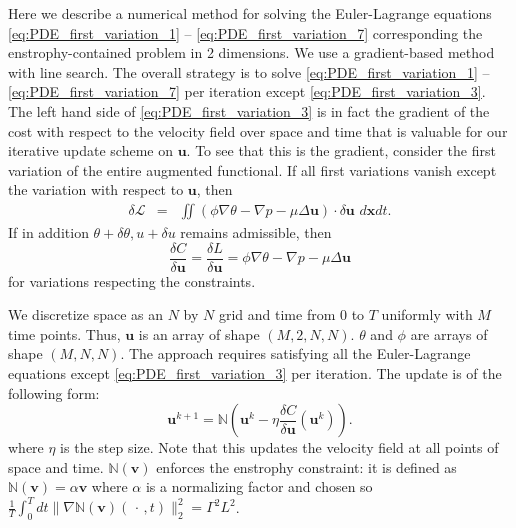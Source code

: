 Here we describe a numerical method for solving the Euler-Lagrange equations \eqref{eq:PDE_first_variation_1} -- \eqref{eq:PDE_first_variation_7} corresponding the enstrophy-contained problem in 2 dimensions. We use a gradient-based method with line search. The overall strategy is to solve \eqref{eq:PDE_first_variation_1} -- \eqref{eq:PDE_first_variation_7} per iteration except \eqref{eq:PDE_first_variation_3}. The left hand side of \eqref{eq:PDE_first_variation_3} is in fact the gradient of the cost with respect to the velocity field over space and time that is valuable for our iterative update scheme on $\mathbf{u}$. To see that this is the gradient, consider the first variation of the entire augmented functional. If all first variations vanish except the variation with respect to $\mathbf{u}$, then
%
  \begin{eqnarray*}
 	\delta \mathcal{L}&=&  \iint ( \phi \nabla\theta - \nabla p -\mu \Delta \mathbf{u})\cdot \delta\mathbf{u} \,\, d\mathbf{x}dt .
\end{eqnarray*}
%
If in addition ${\theta + \delta\theta,u+ \delta u}$  remains admissible, then 
\begin{equation}
\label{eq:gradient-relation}
\frac{\delta C}{\delta \mathbf{u}} = \frac{\delta L}{\delta \mathbf{u}}=  \phi \nabla\theta - \nabla p -\mu \Delta \mathbf{u}
\end{equation}
for variations respecting the constraints. 

We discretize space as an $N$ by $N$ grid and time from $0$ to $T$ uniformly with $M$ time points. Thus, $\mathbf{u}$ is an array of shape $(M,2,N,N)$. $\theta$ and $\phi$ are arrays of shape $(M,N,N)$. The approach requires satisfying all the Euler-Lagrange equations except \eqref{eq:PDE_first_variation_3} per iteration. The update is of the following form:
\begin{equation}
\label{eq:update}
\mathbf{u}^{k+1} = \mathds{N}\left(\mathbf{u}^{k} - \eta \frac{\delta C}{\delta \mathbf{u}}(\mathbf{u}^{k})\right).
\end{equation}
where $\eta$ is the step size. Note that this updates the velocity field at all points of space and time. $\mathds{N}(\mathbf{v})$ enforces the enstrophy constraint: it is defined as $\mathds{N}(\mathbf{v}) = \alpha \mathbf{v}$ where $\alpha$ is a normalizing factor and chosen so $\frac{1}{T}\int_0^Tdt\|\nabla \mathds{N}(\mathbf{v}) (\,\cdot\, ,t)\|_{2}^2 = \Gamma^2 L^2 $.

